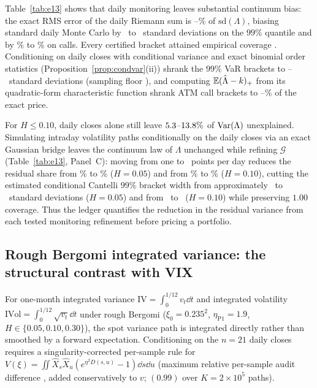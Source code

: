 Table~\ref{tab:e13} shows that daily monitoring leaves substantial continuum bias: the exact RMS error of
the daily Riemann sum is \EthirteenRiLo--\EthirteenRiHi\% of $\mathrm{sd}(\Lambda)$, biasing standard
daily Monte Carlo by \EthirteenNaiveLo\ to \EthirteenNaiveHi\ standard deviations on the $99\%$ quantile
and by \EthirteenPriceBiasLo\% to \EthirteenPriceBiasHi\% on calls. Every certified bracket attained
empirical coverage \EthirteenCovMin. Conditioning on daily closes with conditional variance and exact
binomial order statistics (Proposition~\ref{prop:condvar}(ii)) shrank the $99\%$ VaR brackets to
\EthirteendLo--\EthirteendHi\ standard deviations (sampling floor \EthirteendFloorHi), and computing
$\mathbb{E}(\hat\Lambda-k)_+$ from its quadratic-form characteristic function shrank ATM call brackets to
\EthirteencAtmLo--\EthirteencAtmHi\% of the exact price.

For $H\le0.10$, daily closes alone still leave $5.3$--$13.8\%$ of $\operatorname{Var}(\Lambda)$
unexplained. Simulating
intraday volatility paths conditionally on the daily closes via an exact Gaussian bridge leaves the
continuum law of $\Lambda$ unchanged while refining $\mathcal{G}$ (Table~\ref{tab:e13}, Panel~C): moving from one
to \EthirteenbMaxDaya\ points per day reduces the residual share from \EthirteenbSaOne\% to
\EthirteenbSaEight\% ($H=0.05$) and from \EthirteenbSbOne\% to \EthirteenbSbEight\% ($H=0.10$), cutting
the estimated conditional Cantelli $99\%$ bracket width from approximately \EthirteenbDaOne\ to \EthirteenbDaEight\ standard
deviations ($H=0.05$) and from \EthirteenbDbOne\ to \EthirteenbDbEight\ ($H=0.10$) while preserving
$1.00$ coverage. Thus the ledger quantifies the reduction in the residual variance from each tested monitoring refinement before
pricing a portfolio.

%

\subsection{Rough Bergomi integrated variance: the structural contrast with VIX}\label{sec:case_iv}
For one-month integrated variance $\mathrm{IV}=\int_0^{1/12} v_t\dd t$ and integrated volatility
$\mathrm{IVol}=\int_0^{1/12}\sqrt{v_t}\dd t$ under rough Bergomi ($\xi_0=0.235^2$, $\eta_{\mathrm{P1}}=1.9$,
$H\in\{0.05,0.10,0.30\}$), the spot variance path is integrated directly rather than smoothed by a forward
expectation. Conditioning on the $n=21$ daily closes requires a singularity-corrected per-sample rule for
$V(\xi)=\iint\hat X_s\hat X_u(e^{\eta^2 D(s,u)}-1)\dd s\dd u$ (maximum relative per-sample audit difference
\EsixcAudit, added conservatively to $v$; $(0.99)$ over $K=2\times10^5$ paths).

